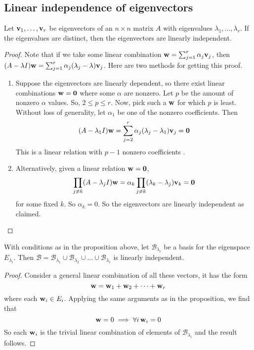 \subsection{Linear independence of eigenvectors}
\begin{proposition}
	Let \(\vb v_1, \dots, \vb v_r\) be eigenvectors of an \(n\times n\) matrix \(A\) with eigenvalues \(\lambda_1,\dots,\lambda_r\).
	If the eigenvalues are distinct, then the eigenvectors are linearly independent.
\end{proposition}
\begin{proof}
	Note that if we take some linear combination \(\vb w = \sum_{j=1}^r \alpha_j\vb v_j\), then \((A - \lambda I)\vb w = \sum_{j=1}^r \alpha_j(\lambda_j - \lambda)\vb v_j\).
	Here are two methods for getting this proof.
	\begin{enumerate}
		\item Suppose the eigenvectors are linearly dependent, so there exist linear combinations \(\vb w = \vb 0\) where some \(\alpha\) are nonzero.
		      Let \(p\) be the amount of nonzero \(\alpha\) values.
		      So, \(2 \leq p \leq r\).
		      Now, pick such a \(\vb w\) for which \(p\) is least.
		      Without loss of generality, let \(\alpha_1\) be one of the nonzero coefficients.
		      Then
		      \[
			      (A - \lambda_1 I)\vb w = \sum_{j=2}^r \alpha_j(\lambda_j - \lambda_1)\vb v_j = \vb 0
		      \]
		      This is a linear relation with \(p-1\) nonzero coefficients \contradiction.
		\item Alternatively, given a linear relation \(\vb w=\vb 0\),
		      \[
			      \prod_{j \neq k} (A - \lambda_j I) \vb w = \alpha_k \prod_{j \neq k} (\lambda_k - \lambda_j) \vb v_k = \vb 0
		      \]
		      for some fixed \(k\).
		      So \(\alpha_k = 0\).
		      So the eigenvectors are linearly independent as claimed.
	\end{enumerate}
\end{proof}
\begin{corollary}
	With conditions as in the proposition above, let \(\mathcal B_{\lambda_i}\) be a basis for the eigenspace \(E_{\lambda_i}\).
	Then \(\mathcal B = \mathcal B_{\lambda_1} \cup \mathcal B_{\lambda_2} \cup \dots \cup \mathcal B_{\lambda_r}\) is linearly independent.
\end{corollary}
\begin{proof}
	Consider a general linear combination of all these vectors, it has the form
	\[
		\vb w = \vb w_1 + \vb w_2 + \dots + \vb w_r
	\]
	where each \(\vb w_i \in E_i\).
	Applying the same arguments as in the proposition, we find that
	\[
		\vb w = 0 \implies \forall i\,\vb w_i = 0
	\]
	So each \(\vb w_i\) is the trivial linear combination of elements of \(\mathcal B_{\lambda_i}\) and the result follows.
\end{proof}

